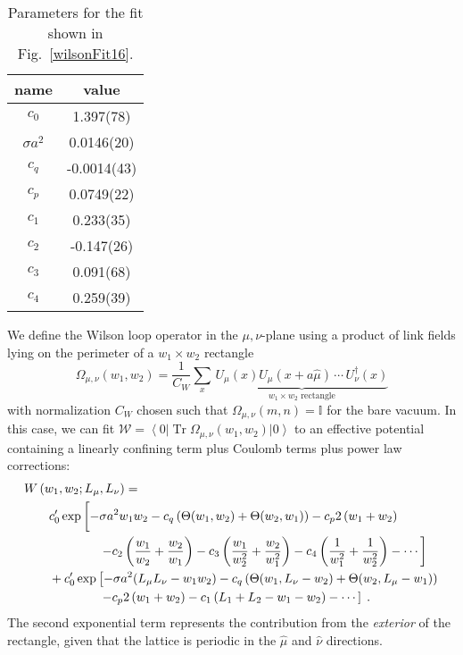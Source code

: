 \documentclass[preprint,aps,prd]{revtex4-2}
\newcommand{\be}{\begin{equation}}
\newcommand{\eq}{\end{equation}}
\newcommand\wilson[4]{\Omega_{#1, #2}\left(#3,#4\right)}
\DeclareMathOperator{\Tr}{Tr}
\begin{document}
%
\begin{table}
  \caption{Parameters for the fit shown in Fig.~\ref{wilsonFit16}.
    \label{wilsonparameters}}
  \begin{tabular}{c|c}
    name & value \\
    \hline
  $c_0$ &  1.397(78)\\
  $\sigma a^2$ & 0.0146(20) \\
  $c_q$ &  -0.0014(43)\\
  $c_p$ &  0.0749(22)\\
  $c_1$ &  0.233(35)\\
  $c_2$ &  -0.147(26)\\
  $c_3$ &  0.091(68)\\
  $c_4$ & 0.259(39)\\
  \end{tabular}
\end{table}

We define the Wilson loop operator in the $\mu,\nu$-plane using a product of
link fields lying on the perimeter of a $w_1\times w_2$ rectangle
\be
       \wilson{\mu}{\nu}{w_1}{w_2} = \frac{1}{C_W} \sum_{x}\,
         \underbrace{U_\mu(x) U_\mu(x+a \hat{\mu}) \,\cdots\, U_\nu^\dagger (x)
         }_{\mbox{$w_1\times w_2$ rectangle}}
\eq
with normalization $C_W$ chosen such that $\wilson{\mu}{\nu}{m}{n} = \mathbb{I}$
for the bare vacuum.  In this case, we can fit
$\mathcal{W} = \left\langle 0 \right|
 \Tr \wilson{\mu}{\nu}{w_1}{w_2} \left|0\right\rangle $
to an effective
potential containing a linearly confining term plus Coulomb terms
plus power law corrections:
%
\begin{align}
  \MoveEqLeft W\left(w_1, w_2; L_\mu, L_\nu\right) =  \nonumber \\
       & c_0^\prime \exp\left[
       -\sigma a^2 w_1 w_2 
       - c_q  \left(\Theta\!\left(w_1, w_2\right) +
       \Theta\!\left(w_2, w_1\right)\right)
       - c_p  2\left(w_1+w_2\right)
     \vphantom{\frac{w_1}{w_2}}\right. \nonumber \\ & \hspace{4em} \left.
           - c_2 \left(\frac{w_1}{w_2}+\frac{w_2}{w_1}\right)
           - c_3 \left(\frac{w_1}{w_2^2}+\frac{w_2}{w_1^2}\right)
           - c_4 \left(\frac{1}{w_1^2}+\frac{1}{w_2^2}\right) - \cdots
       \right]\nonumber\\ &
      \mbox{} + c_0^\prime \exp\left[
       -\sigma a^2 (L_\mu L_\nu - w_1 w_2) -
           c_q  \left(\Theta\!\left(w_1, L_\nu - w_2\right) +
               \Theta\!\left(w_2, L_\mu - w_1\right)\right)
       \right. \nonumber \\ & \hspace{4em} \left.
       - c_p  2\left(w_1+w_2\right) 
     - c_1\left(L_1 +L_2 - w_1 -w_2\right) - \cdots
     \right]\; .  \label{wfit}
\end{align}
%
The second exponential term represents the contribution from
the {\em exterior} of the rectangle, given that the lattice
is periodic in the $\hat{\mu}$ and $\hat\nu$ directions.
\end{document}
